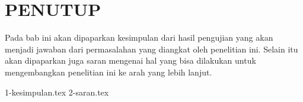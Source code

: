 \chapter{PENUTUP}
\label{chap:penutup}

Pada bab ini akan dipaparkan kesimpulan dari hasil pengujian yang akan menjadi jawaban dari permasalahan yang diangkat oleh penelitian ini.
Selain itu akan dipaparkan juga saran mengenai hal yang bisa dilakukan untuk mengembangkan penelitian ini ke arah yang lebih lanjut.

{1-kesimpulan.tex}
{2-saran.tex}
